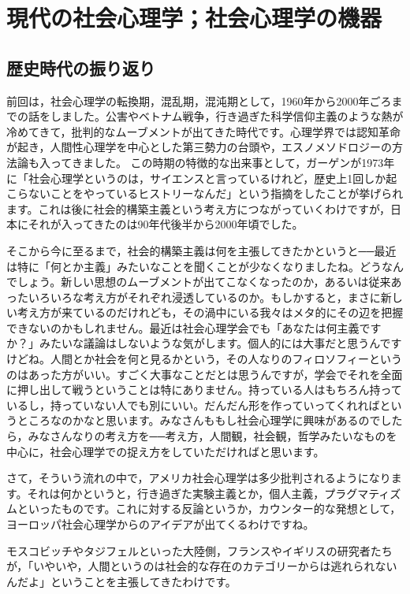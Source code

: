 \documentclass{ltjsbook}
\begin{document}
\setcounter{chapter}{6}
\chapter{現代の社会心理学；社会心理学の機器}
\label{sp07_current}

\section{歴史時代の振り返り}

前回は，社会心理学の転換期，混乱期，混沌期として，1960年から2000年ごろまでの話をしました。公害やベトナム戦争，行き過ぎた科学信仰主義のような熱が冷めてきて，批判的なムーブメントが出てきた時代です。心理学界では認知革命が起き，人間性心理学を中心とした第三勢力の台頭や，エスノメソドロジーの方法論も入ってきました。
この時期の特徴的な出来事として，ガーゲンが1973年に「社会心理学というのは，サイエンスと言っているけれど，歴史上1回しか起こらないことをやっているヒストリーなんだ」という指摘をしたことが挙げられます。これは後に社会的構築主義という考え方につながっていくわけですが，日本にそれが入ってきたのは90年代後半から2000年頃でした。

そこから今に至るまで，社会的構築主義は何を主張してきたかというと──最近は特に「何とか主義」みたいなことを聞くことが少なくなりましたね。どうなんでしょう。新しい思想のムーブメントが出てこなくなったのか，あるいは従来あったいろいろな考え方がそれぞれ浸透しているのか。もしかすると，まさに新しい考え方が来ているのだけれども，その渦中にいる我々はメタ的にその辺を把握できないのかもしれません。最近は社会心理学会でも「あなたは何主義ですか？」みたいな議論はしないような気がします。個人的には大事だと思うんですけどね。人間とか社会を何と見るかという，その人なりのフィロソフィーというのはあった方がいい。すごく大事なことだとは思うんですが，学会でそれを全面に押し出して戦うということは特にありません。持っている人はもちろん持っているし，持っていない人でも別にいい。だんだん形を作っていってくれればというところなのかなと思います。みなさんももし社会心理学に興味があるのでしたら，みなさんなりの考え方を──考え方，人間観，社会観，哲学みたいなものを中心に，社会心理学での捉え方をしていただければと思います。

さて，そういう流れの中で，アメリカ社会心理学は多少批判されるようになります。それは何かというと，行き過ぎた実験主義とか，個人主義，プラグマティズムといったものです。これに対する反論というか，カウンター的な発想として，ヨーロッパ社会心理学からのアイデアが出てくるわけですね。

モスコビッチやタジフェルといった大陸側，フランスやイギリスの研究者たちが，「いやいや，人間というのは社会的な存在のカテゴリーからは逃れられないんだよ」ということを主張してきたわけです。
\end{document}
